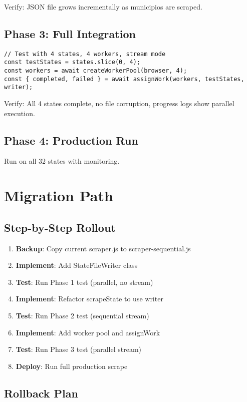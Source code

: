 \documentclass[11pt,a4paper]{article}
\begin{document}
Verify: JSON file grows incrementally as municipios are scraped.

\subsection{Phase 3: Full Integration}

\begin{lstlisting}
// Test with 4 states, 4 workers, stream mode
const testStates = states.slice(0, 4);
const workers = await createWorkerPool(browser, 4);
const { completed, failed } = await assignWork(workers, testStates, writer);
\end{lstlisting}

Verify: All 4 states complete, no file corruption, progress logs show parallel execution.

\subsection{Phase 4: Production Run}

Run on all 32 states with monitoring.

\section{Migration Path}

\subsection{Step-by-Step Rollout}

\begin{enumerate}
    \item \textbf{Backup}: Copy current scraper.js to scraper-sequential.js
    \item \textbf{Implement}: Add StateFileWriter class
    \item \textbf{Test}: Run Phase 1 test (parallel, no stream)
    \item \textbf{Implement}: Refactor scrapeState to use writer
    \item \textbf{Test}: Run Phase 2 test (sequential stream)
    \item \textbf{Implement}: Add worker pool and assignWork
    \item \textbf{Test}: Run Phase 3 test (parallel stream)
    \item \textbf{Deploy}: Run full production scrape
\end{enumerate}

\subsection{Rollback Plan}
\end{document}
